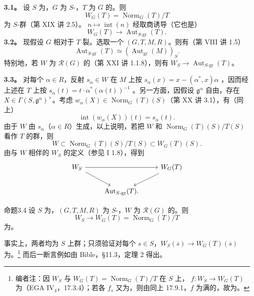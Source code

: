 \textbf{3.1。} 设 $S$ 为，$G$ 为 $S$-，$T$ 为 $G$ 的。则
\[W_G(T)=\operatorname{Norm}_G(T)/T\]
为 $S$-群（第 XIX 讲 2.5）。 $n\mapsto\operatorname{int}(n)$ 经取商诱导（它也是）
\[W_G(T)\longrightarrow\operatorname{Aut}_{S\text{-gr}}(T).\]
\textbf{3.2。} 现假设 $G$ 相对于 $T$ 裂。选取一个 $(G,T,M,R)$。则有（第 VIII 讲 1.5）
\[\operatorname{Aut}_{S\text{-gr}}(T)\simeq(\operatorname{Aut}_{\mathrm{gr}}(M))_S.\]
特别地，若 $W$ 为 $\mathcal R(G)$ 的（第 XXI 讲 1.1.8），则有 $W_S\to\operatorname{Aut}_{S\text{-gr}}(T)$。

\textbf{3.3。} 对每个 $\alpha\in R$，反射 $s_\alpha\in W$ 在 $M$ 上按 $s_\alpha(x)=x-(\alpha^*,x)\alpha$ ，因而经上述在 $T$ 上按 $s_\alpha(t)=t\cdot\alpha^*(\alpha(t))^{-1}$ 。另一方面，因假设 $\mathfrak g^\alpha$ 自由，存在 $X\in\Gamma(S,\mathfrak g^\alpha)^\times$。考虑 $w_\alpha(X)\in\operatorname{Norm}_G(T)(S)$（第 XX 讲 3.1），有（同上）
\[\operatorname{int}(w_\alpha(X))(t)=s_\alpha(t).\]
由于 $W$ 由 $s_\alpha$（$\alpha\in R$）生成，以上说明，若把 $W$ 和 $\operatorname{Norm}_G(T)(S)/T(S)$ 看作 $T$ 的群，则
\[W\subset\operatorname{Norm}_G(T)(S)/T(S)\subset W_G(T)(S).\]
由与 $W$ 相伴的 $W_S$ 的定义（参见 I 1.8），得到
\[\begin{tikzcd}W_S\arrow[rr]\arrow[dr]&&W_G(T)\arrow[dl]\\&\operatorname{Aut}_{S\text{-gr}}(T).&\end{tikzcd}\]
\begin{SGAresult}{命题}{3.4} 设 $S$ 为，$(G,T,M,R)$ 为 $S$-，$W$ 为 $\mathcal R(G)$ 的。则
\[W_S\longrightarrow W_G(T)=\operatorname{Norm}_G(T)/T\]
为。\end{SGAresult}
事实上，两者均为 $S$ 上群；只须验证对每个 $s\in S$，$W_S(\overline s)\to W_G(T)(\overline s)$ 为。\footnote{编者注：因 $W_S$ 与 $W_G(T)=\operatorname{Norm}_G(T)/T$ 在 $S$ 上， $f:W_S\to W_G(T)$ 为（EGA IV$_4$，17.3.4）；若各 $f_{\overline s}$ 又为，则由同上 17.9.1，$f$ 为满的，故为。} 而后一断言例如由 Bible，§11.3，定理 2 得出。

